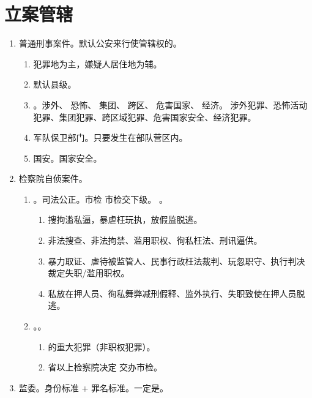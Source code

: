 \section{立案管辖}
\begin{enumerate}
  \item 普通刑事案件。默认公安来行使管辖权的。
        \begin{enumerate}
          \item 犯罪地为主，嫌疑人居住地为辅。
          \item 默认县级。
          \item {}。涉外、 恐怖、 集团、 跨区、 危害国家、 经济。
                涉外犯罪、恐怖活动犯罪、集团犯罪、跨区域犯罪、危害国家安全、经济犯罪。
          \item 军队保卫部门。只要发生在部队营区内。
          \item 国安。国家安全。
        \end{enumerate}
  \item 检察院自侦案件。
        \begin{enumerate}
          \item {}。司法公正。市检 \hz 市检交下级。
                。
                \begin{enumerate}
                  \item 搜拘滥私逼，暴虐枉玩执，放假监脱逃。
                  \item 非法搜查、非法拘禁、滥用职权、徇私枉法、刑讯逼供。
                  \item 暴力取证、虐待被监管人、民事行政枉法裁判、玩忽职守、执行判决裁定失职/滥用职权。
                  \item 私放在押人员、徇私舞弊减刑假释、监外执行、失职致使在押人员脱逃。
                \end{enumerate}
          \item {}。。
                \begin{enumerate}
                  \item {}的重大犯罪（非职权犯罪）。
                  \item 省以上检察院决定 \yjt 交办市检。
                \end{enumerate}
        \end{enumerate}
  \item 监委。身份标准 + 罪名标准。一定是。

\end{enumerate}
